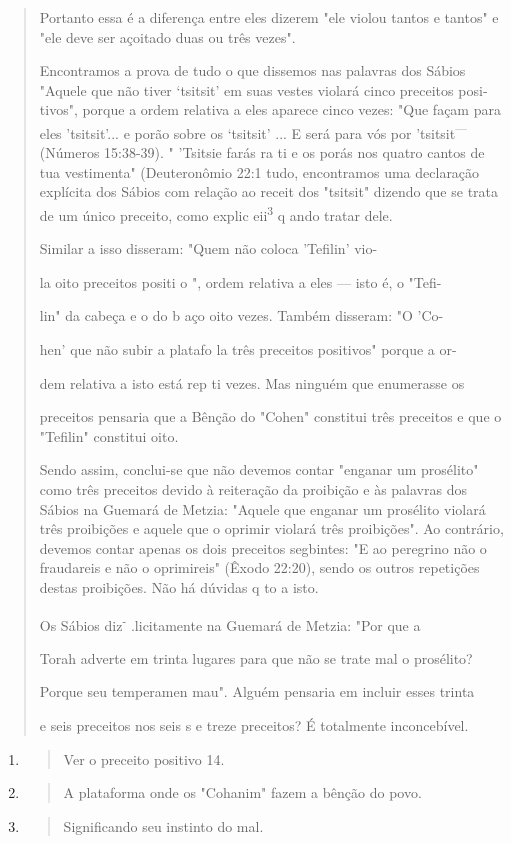\begin{quote}
Portanto essa é a diferença entre eles dizerem "ele violou tantos e
tantos" e "ele deve ser açoitado duas ou três vezes".

Encontramos a prova de tudo o que dissemos nas palavras dos Sá­bios
"Aquele que não tiver `tsitsit' em suas vestes violará cinco preceitos
posi­tivos", porque a ordem relativa a eles aparece cinco vezes: "Que
façam para eles 'tsitsit'... e porão sobre os `tsitsit' ... E será para
vós por 'tsitsit\textsuperscript{---} (Números 15:38-39). " 'Tsitsie
farás ra ti e os porás nos quatro cantos de tua vestimen­ta"
(Deuteronômio 22:1 tudo, encontramos uma declaração explícita dos Sábios
com relação ao receit dos "tsitsit" dizendo que se trata de um único
preceito, como explic eii\textsuperscript{3} q ando tratar dele.

Similar a isso disseram: "Quem não coloca 'Tefilin' vio-

la oito preceitos positi o ", ordem relativa a eles --- isto é, o "Tefi-

lin" da cabeça e o do b aço oito vezes. Também disseram: "O 'Co-

hen' que não subir a platafo la três preceitos positivos" porque a or-

dem relativa a isto está rep ti vezes. Mas ninguém que enumerasse os

preceitos pensaria que a Bênção do "Cohen" constitui três preceitos e
que o "Tefilin" constitui oito.

Sendo assim, conclui-se que não devemos contar "enganar um pro­sélito"
como três preceitos devido à reiteração da proibição e às palavras dos
Sábios na Guemará de Metzia: "Aquele que enganar um prosélito violará
três proibições e aquele que o oprimir violará três proibições". Ao
contrário, deve­mos contar apenas os dois preceitos segbintes: "E ao
peregrino não o frauda­reis e não o oprimireis" (Êxodo 22:20), sendo os
outros repetições destas proi­bições. Não há dúvidas q to a isto.

Os Sábios diz\textsuperscript{-} .licitamente na Guemará de Metzia: "Por
que a

Torah adverte em trinta lugares para que não se trate mal o prosélito?

Porque seu temperamen mau". Alguém pensaria em incluir esses trinta

e seis preceitos nos seis s e treze preceitos? É totalmente
inconcebível.
\end{quote}

\begin{enumerate}
\def\labelenumi{\arabic{enumi}.}
\setcounter{enumi}{12}
\item
  \begin{quote}
  Ver o preceito positivo 14.
  \end{quote}
\item
  \begin{quote}
  A plataforma onde os "Cohanim" fazem a bênção do povo.
  \end{quote}
\item
  \begin{quote}
  Significando seu instinto do mal.
  \end{quote}
\end{enumerate}

